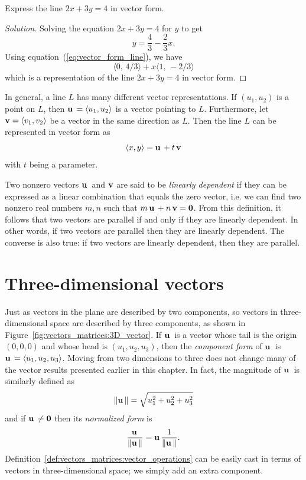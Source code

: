\begin{example}
Express the line $2x + 3y = 4$ in vector form.
\end{example}

\begin{proof}[Solution]
Solving the equation $2x + 3y = 4$ for $y$ to get
\[
y = \frac{4}{3} - \frac{2}{3} x.
\]
Using equation~(\ref{eq:vector_form_line}), we have
\[
\langle 0,\, 4/3 \rangle
+ x \langle 1,\, -2/3 \rangle
\]
which is a representation of the line $2x + 3y = 4$ in vector form.
\end{proof}

In general, a line $L$ has many different vector representations. If
$(u_1, u_2)$ is a point on $L$, then $\operatorname*{\mathbf{u}}{} = \langle u_1, u_2
\rangle$ is a vector pointing to $L$. Furthermore, let $\operatorname*{\mathbf{v}} =
\langle v_1, v_2 \rangle$ be a vector in the same direction as
$L$. Then the line $L$ can be represented in vector form as
\[
\langle x, y \rangle
=
\operatorname*{\mathbf{u}}{} + t \operatorname*{\mathbf{v}}
\]
with $t$ being a parameter.

Two nonzero vectors $\operatorname*{\mathbf{u}}{}$ and $\operatorname*{\mathbf{v}}$ are said to be
\emph{linearly dependent} if they can be
expressed as a linear combination that equals the zero vector, i.e. we
can find two nonzero real numbers $m,n$ such that
$m\operatorname*{\mathbf{u}}{} + n\operatorname*{\mathbf{v}} = \operatorname*{\textbf{0}}$. From this definition, it follows that
two vectors are parallel if and only if they are linearly
dependent. In other words, if two vectors are parallel then they are
linearly dependent. The converse is also true: if two vectors are
linearly dependent, then they are parallel.



\section{Three-dimensional vectors}

Just as vectors in the plane are described by two components, so
vectors in three-dimensional space are described by three components,
as shown in Figure~\ref{fig:vectors_matrices:3D_vector}. If $\operatorname*{\mathbf{u}}{}$ is
a vector whose tail is the origin $(0,0,0)$ and whose head is
$(u_1, u_2, u_3)$, then the \emph{component form} of $\operatorname*{\mathbf{u}}{}$ is
$\operatorname*{\mathbf{u}}{} = \langle u_1, u_2, u_3 \rangle$. Moving from two dimensions to
three does not change many of the vector results presented earlier in
this chapter. In fact, the magnitude of $\operatorname*{\mathbf{u}}{}$ is similarly defined as
%
\begin{equation}
\label{eq:vectors_matrices:magnitude_three_dimensional_vector}
\left\Arrowvert \operatorname*{\mathbf{u}}{} \right\Arrowvert
=
\sqrt{u_1^2 + u_2^2 + u_3^2}
\end{equation}
%
and if $\operatorname*{\mathbf{u}}{} \neq \operatorname*{\textbf{0}}$ then its \emph{normalized form} is
%
\begin{equation}
\label{eq:normalize_vector_three_dimensions}
\frac{\operatorname*{\mathbf{u}}{}}{\left\Arrowvert \operatorname*{\mathbf{u}}{} \right\Arrowvert}
=
\operatorname*{\mathbf{u}}{} \frac{1}{\left\Arrowvert \operatorname*{\mathbf{u}}{} \right\Arrowvert}.
\end{equation}
%
Definition~\ref{def:vectors_matrices:vector_operations} can be easily
cast in terms of vectors in three-dimensional space; we simply add an
extra component.

